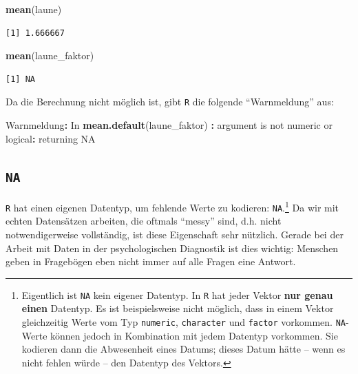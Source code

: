 \documentclass[12pt,]{tufte-book}
\newenvironment{Shaded}{\begin{snugshade}}{\end{snugshade}}
\newcommand{\KeywordTok}[1]{\textcolor[rgb]{0.13,0.29,0.53}{\textbf{#1}}}
\newcommand{\StringTok}[1]{\textcolor[rgb]{0.31,0.60,0.02}{#1}}
\newcommand{\OtherTok}[1]{\textcolor[rgb]{0.56,0.35,0.01}{#1}}
\newcommand{\OperatorTok}[1]{\textcolor[rgb]{0.81,0.36,0.00}{\textbf{#1}}}
\newcommand{\NormalTok}[1]{#1}
\theoremstyle{definition}
\theoremstyle{definition}
\theoremstyle{definition}
\theoremstyle{remark}
\begin{document}
\begin{Shaded}
\begin{Highlighting}[]
\KeywordTok{mean}\NormalTok{(laune)}
\end{Highlighting}
\end{Shaded}

\begin{verbatim}
[1] 1.666667
\end{verbatim}

\begin{Shaded}
\begin{Highlighting}[]
\KeywordTok{mean}\NormalTok{(laune_faktor)}
\end{Highlighting}
\end{Shaded}

\begin{verbatim}
[1] NA
\end{verbatim}

Da die Berechnung nicht möglich ist, gibt \texttt{R} die folgende
``Warnmeldung'' aus:

\begin{Shaded}
\begin{Highlighting}[]

\NormalTok{Warnmeldung}\OperatorTok{:}
\NormalTok{In }\KeywordTok{mean.default}\NormalTok{(laune_faktor) }\OperatorTok{:}
\StringTok{  }\NormalTok{argument is not numeric or logical}\OperatorTok{:}\StringTok{ }\NormalTok{returning }\OtherTok{NA}
\end{Highlighting}
\end{Shaded}

\subsection{\texorpdfstring{\texttt{NA}}{NA}}\label{na}

\texttt{R} hat einen eigenen Datentyp, um fehlende Werte zu kodieren:
\texttt{NA}.\footnote{Eigentlich ist \texttt{NA} kein eigener Datentyp.
  In \texttt{R} hat jeder Vektor \textbf{nur genau einen} Datentyp. Es
  ist beispielsweise nicht möglich, dass in einem Vektor gleichzeitig
  Werte vom Typ \texttt{numeric}, \texttt{character} und \texttt{factor}
  vorkommen. \texttt{NA}-Werte können jedoch in Kombination mit jedem
  Datentyp vorkommen. Sie kodieren dann die Abwesenheit eines Datums;
  dieses Datum hätte -- wenn es nicht fehlen würde -- den Datentyp des
  Vektors.} Da wir mit echten Datensätzen arbeiten, die oftmals
``messy'' sind, d.h. nicht notwendigerweise vollständig, ist diese
Eigenschaft sehr nützlich. Gerade bei der Arbeit mit Daten in der
psychologischen Diagnostik ist dies wichtig: Menschen geben in
Fragebögen eben nicht immer auf alle Fragen eine Antwort.
\end{document}
